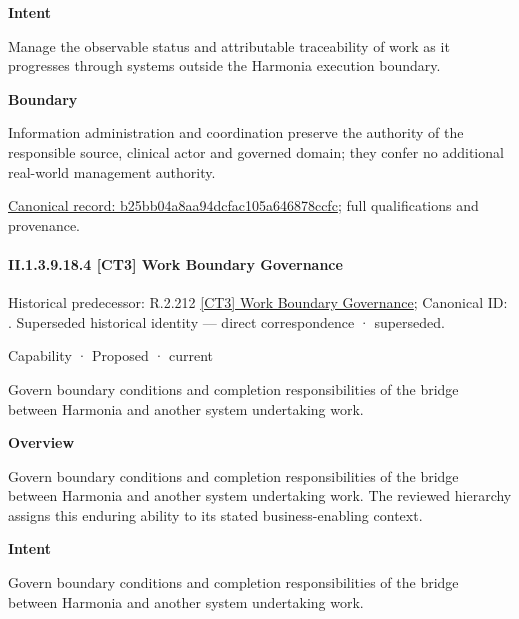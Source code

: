 \textbf{Intent}



Manage the observable status and attributable traceability of work as it progresses through systems outside the Harmonia execution boundary.



\textbf{Boundary}



Information administration and coordination preserve the authority of the responsible source, clinical actor and governed domain; they confer no additional real-world management authority.


{\footnotesize \href{../../../../../../../continuum/strategy/capability/b25bb04a8aa94dcfac105a646878ccfc.md}{Canonical record: b25bb04a8aa94dcfac105a646878ccfc}; full qualifications and provenance.}\par
\paragraph*{II.1.3.9.18.4 [CT3] Work Boundary Governance}
\label{navigation:II.1.3.9.18.4}

{\small Historical predecessor: R.2.212 \hyperref[element:b4d14abf930a4230a7f5b93e9ce3df91]{[CT3] Work Boundary Governance}; Canonical ID: \texttt{}. Superseded historical identity — direct correspondence · superseded.}\par
\label{element:35b66a0b38db4568849ecb842ffdcbf3}
{\small Capability · Proposed · current}\par

Govern boundary conditions and completion responsibilities of the bridge between Harmonia and another system undertaking work.



\textbf{Overview}



Govern boundary conditions and completion responsibilities of the bridge between Harmonia and another system undertaking work. The reviewed hierarchy assigns this enduring ability to its stated business-enabling context.



\textbf{Intent}



Govern boundary conditions and completion responsibilities of the bridge between Harmonia and another system undertaking work.



